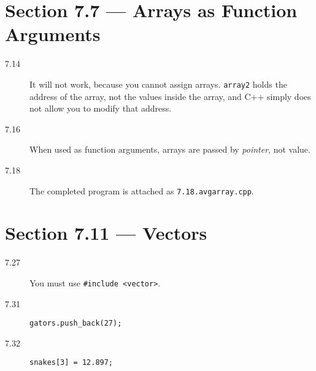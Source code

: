\documentclass[11pt]{article}
\begin{document}
\section*{Section 7.7 --- Arrays as Function Arguments}
\begin{description}
    \item[7.14] It will not work, because you cannot assign arrays. \lstinline{array2} holds the address of the array, not the values inside the array, and C++ simply does not allow you to modify that address.
    \item[7.16] When used as function arguments, arrays are passed by \emph{pointer}, not value.
    \item[7.18] The completed program is attached as \texttt{7.18.avgarray.cpp}.
\end{description}

\section*{Section 7.11 --- Vectors}
\begin{description}
    \item[7.27] You must use \lstinline{#include <vector>}.
    \item[7.31] \lstinline{gators.push_back(27);}
    \item[7.32] \lstinline{snakes[3] = 12.897;}
\end{description}
\end{document}
